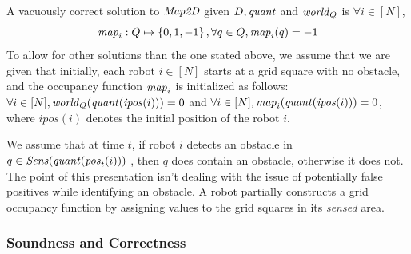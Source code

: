  
A vacuously correct solution to $\mathit{Map2D}$ given $D, \mathit{quant}$ and $\mathit{world}_Q$ is $\forall i \in [N]$, $$\mathit{map}_i : Q \mapsto \left\{0,1,-1\right\}, \forall  q \in Q , \mathit{map}_i(q)= -1$$ To allow for other solutions than the one stated above, we assume that we are given that initially, each robot $i\in[N]$ starts at a grid square with no obstacle, and the occupancy function $\mathit{map}_i$ is initialized as follows:
 $\forall i \in [N], \mathit{world}_Q(\mathit{quant}(\mathit{ipos}(i))) = 0$ and 
 $\forall i \in [N], \mathit{map}_i(\mathit{quant}(\mathit{ipos}(i))) = 0$,
  where $\mathit{ipos}(i)$ denotes the initial position of the robot $i$. 


We assume that at time $t$, if robot $i$ detects an obstacle in $q \in \mathit{Sens}(\mathit{quant}(\mathit{pos}_t(i)))$ , then $q$ does contain an obstacle, otherwise it does not. The point of this presentation isn't dealing with the issue of potentially false positives while identifying an obstacle. A robot partially constructs a grid occupancy function by assigning values to the grid squares in its \emph{sensed} area.

\subsubsection{Soundness and Correctness}



